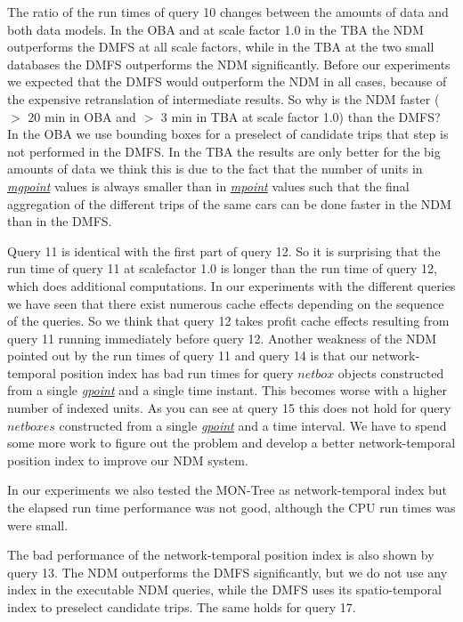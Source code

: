 \documentclass[a4paper]{article}
\newcommand{\dt}[1]{\textsl{\underline{#1}}}
\begin{document}
{The ratio of the run times of query 10 changes between the amounts of data and
both data models. In the OBA and at scale factor 1.0 in the TBA the NDM outperforms
the DMFS at all scale factors, while in the TBA at the two small databases the
DMFS outperforms the NDM significantly. Before our experiments we expected that
the DMFS would outperform the NDM in all cases, because of the expensive
retranslation of intermediate results. So why is the NDM faster ($>$ 20 min in
OBA and $>$ 3 min in TBA at scale factor 1.0) than the DMFS?
In the OBA we use bounding boxes for a preselect of candidate trips that step is not
performed in the DMFS. In the TBA the results are only better for the big amounts
of data we think this is due to the fact that the number of units in \dt{mgpoint}
values is always smaller than in \dt{mpoint} values such that the final aggregation
of the different trips of the same cars can be done faster in the NDM
than in the DMFS.

Query 11 is identical with the first part of query 12. So it is surprising that
the run time of query 11 at scalefactor 1.0 is longer than the run time of query 12,
which does additional computations. In our experiments with the different queries
we have seen that there exist numerous cache effects depending on the sequence of
the queries. So we think that query 12 takes profit cache effects resulting from
query 11 running immediately before query 12. Another weakness of the NDM pointed
out by the run times of query 11 and query 14 is that our
network-temporal position index has bad run times for query $netbox$ objects
constructed from a single \dt{gpoint} and a single time instant. This becomes worse
with a higher number of indexed units. As you can see at query 15 this does not
hold for query $netboxes$ constructed from a single \dt{gpoint} and a time interval.
We have to spend some more work to figure out the problem and develop a better
network-temporal position index to improve our NDM system.

In our experiments we also tested the MON-Tree \cite{MONTreeAlmeidaGeoinformatica} as network-temporal
index but the elapsed run time performance was not good, although the CPU run times
was were small.

The bad performance of the network-temporal position index is also shown by query 13.
The NDM outperforms the DMFS significantly, but we do not use any index in the
executable NDM queries, while the DMFS uses its spatio-temporal index to preselect
candidate trips. The same holds for query 17.

}
\end{document}
